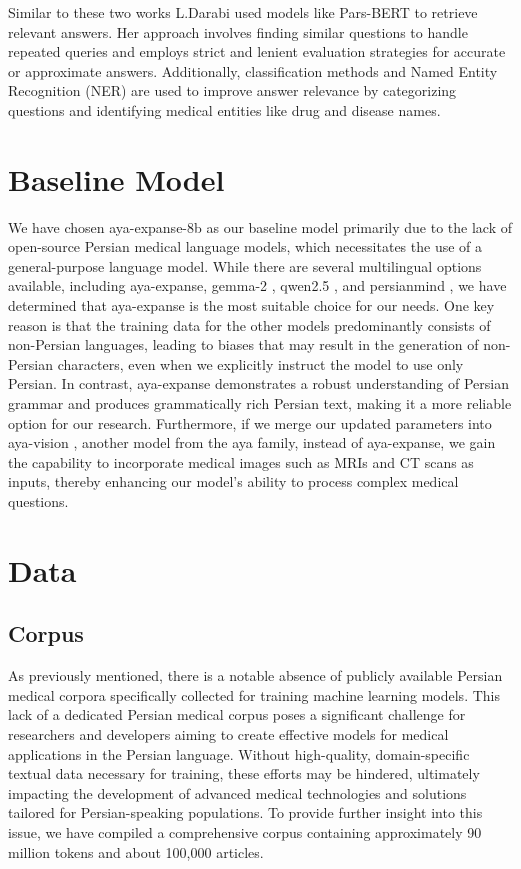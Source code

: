 \documentclass[conference]{IEEEtran}
\begin{document}
	Similar to these two works L.Darabi
	\cite{b14}
	used models like Pars-BERT
	\cite{b15}
	to retrieve relevant answers. Her approach involves finding similar questions to handle repeated queries and employs strict and lenient evaluation strategies for accurate or approximate answers. Additionally, classification methods and Named Entity Recognition (NER) are used to improve answer relevance by categorizing questions and identifying medical entities like drug and disease names.
	
	\section{Baseline Model}
	We have chosen aya-expanse-8b as our baseline model primarily due to the lack of open-source Persian medical language models, which necessitates the use of a general-purpose language model. While there are several multilingual options available, including aya-expanse, gemma-2 \cite{b16}, qwen2.5 \cite{b17}, and persianmind \cite{b18}, we have determined that aya-expanse is the most suitable choice for our needs. One key reason is that the training data for the other models predominantly consists of non-Persian languages, leading to biases that may result in the generation of non-Persian characters, even when we explicitly instruct the model to use only Persian. In contrast, aya-expanse demonstrates a robust understanding of Persian grammar and produces grammatically rich Persian text, making it a more reliable option for our research. Furthermore, if we merge our updated parameters into aya-vision \cite{b19}, another model from the aya family, instead of aya-expanse, we gain the capability to incorporate medical images such as MRIs and CT scans as inputs, thereby enhancing our model’s ability to process complex medical questions.
	\section{Data}
	
	\subsection{Corpus}
	As previously mentioned, there is a notable absence of publicly available Persian medical corpora specifically collected for training machine learning models. This lack of a dedicated Persian medical corpus poses a significant challenge for researchers and developers aiming to create effective models for medical applications in the Persian language. Without high-quality, domain-specific textual data necessary for training, these efforts may be hindered, ultimately impacting the development of advanced medical technologies and solutions tailored for Persian-speaking populations. To provide further insight into this issue, we have compiled a comprehensive corpus containing approximately 90 million tokens and about 100,000 articles. 
	
\end{document}
